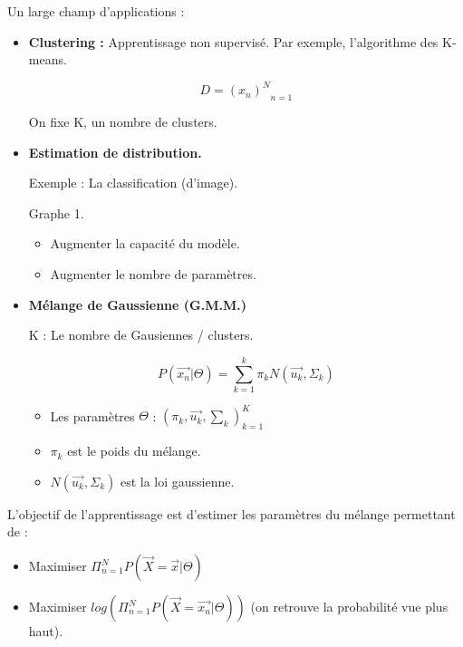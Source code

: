\documentclass{article}
\begin{document}
Un large champ d'applications :

\begin{itemize}

\item \textbf{Clustering :} Apprentissage non supervisé. Par exemple, l'algorithme des K-means.

\[ D = {(x_n)^N}_{n=1}  \]

On fixe K, un nombre de clusters.

\item \textbf{Estimation de distribution.}

Exemple : La classification (d'image).

Graphe 1.

\begin{itemize}
\item Augmenter la capacité du modèle.
\item Augmenter le nombre de paramètres.
\end{itemize}

\item \textbf{Mélange de Gaussienne (G.M.M.)}

K : Le nombre de Gausiennes / clusters.

\[ P(\vec{x_n} | \Theta) = \sum_{k=1}^k \pi_k N(\vec{u_k}, \Sigma_k) \]

\begin{itemize}

\item Les paramètres $\Theta$ : $(\pi_k, \vec{u_k}, \sum_k)_{k=1}^K$

\item $\pi_k$ est le poids du mélange.

\item $N(\vec{u_k}, \Sigma_k)$ est la loi gaussienne.

\end{itemize}

\end{itemize}

L'objectif de l'apprentissage est d'estimer les paramètres du mélange permettant de :

\begin{itemize}
\item Maximiser $ \Pi_{n=1}^N  P(\vec{X} = \vec{x} | \Theta)$

\item Maximiser $log(\Pi_{n=1}^N P(\vec{X} = \vec{x_n} | \Theta))$ (on retrouve la probabilité vue plus haut).

\end{itemize}
\end{document}
